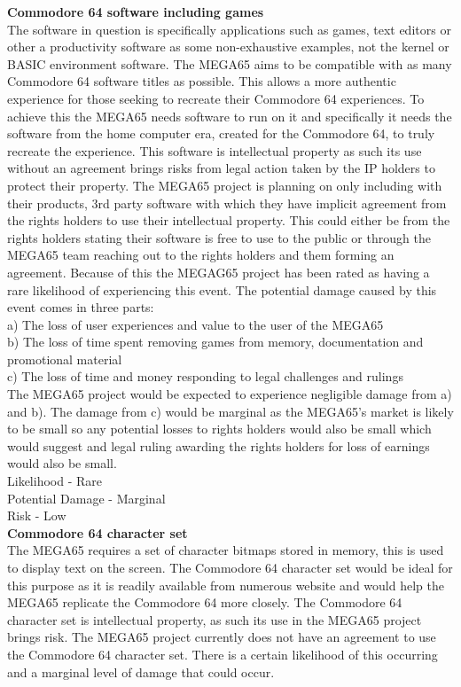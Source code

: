 \textbf{Commodore 64 software including games}\\
The software in question is specifically applications such as games, text editors or other a productivity software as some non-exhaustive examples, not the kernel or BASIC environment software. The MEGA65 aims to be compatible with as many Commodore 64 software titles as possible. This allows a more authentic experience for those seeking to recreate their Commodore 64 experiences. To achieve this the MEGA65 needs software to run on it and specifically it needs the software from the home computer era, created for the Commodore 64, to truly recreate the experience. This software is intellectual property as such its use without an agreement brings risks from legal action taken by the IP holders to protect their property. The MEGA65 project is planning on only including with their products, 3rd party software with which they have implicit agreement from the rights holders to use their intellectual property. This could either be from the rights holders stating their software is free to use to the public or through the MEGA65 team reaching out to the rights holders and them forming an agreement. Because of this the MEGAG65 project has been rated as having a rare likelihood of experiencing this event. The potential damage caused by this event comes in three parts: \\
a) The loss of user experiences and value to the user of the MEGA65 \\
b) The loss of time spent removing games from memory, documentation and promotional material \\
c) The loss of time and money responding to legal challenges and rulings \\
The MEGA65 project would be expected to experience negligible damage from a) and b). The damage from c) would be marginal as the MEGA65's market is likely to be small so any potential losses to rights holders would also be small which would suggest and legal ruling awarding the rights holders for loss of earnings would also be small. \\

Likelihood - Rare \\
Potential Damage - Marginal \\
Risk - Low \\


\textbf{Commodore 64 character set}\\
The MEGA65 requires a set of character bitmaps stored in memory, this is used to display text on the screen. The Commodore 64 character set would be ideal for this purpose as it is readily available from numerous website and would help the MEGA65 replicate the Commodore 64 more closely. The Commodore 64 character set is intellectual property, as such its use in the MEGA65 project brings risk. The MEGA65 project currently does not have an agreement to use the Commodore 64 character set. There is a certain likelihood of this occurring and a marginal level of damage that could occur. \\

